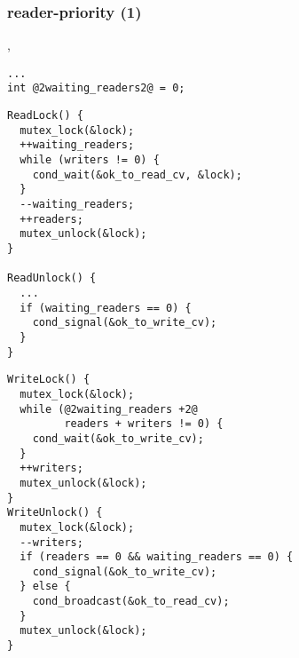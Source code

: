 

\begin{frame}[fragile,label=readerPriority]\frametitle{reader-priority (1)}
,
\begin{lstlisting}
...
int @2waiting_readers2@ = 0;
\end{lstlisting}
\begin{minipage}{0.45\textwidth}
\begin{lstlisting}
ReadLock() {
  mutex_lock(&lock);
  ++waiting_readers;
  while (writers != 0) {
    cond_wait(&ok_to_read_cv, &lock);
  }
  --waiting_readers;
  ++readers;
  mutex_unlock(&lock);
}

ReadUnlock() {
  ...
  if (waiting_readers == 0) {
    cond_signal(&ok_to_write_cv);
  }
}
\end{lstlisting}
\end{minipage}
\begin{minipage}{0.45\textwidth}
\begin{lstlisting}
WriteLock() {
  mutex_lock(&lock);
  while (@2waiting_readers +2@
         readers + writers != 0) {
    cond_wait(&ok_to_write_cv);
  }
  ++writers;
  mutex_unlock(&lock);
}
WriteUnlock() {
  mutex_lock(&lock);
  --writers;
  if (readers == 0 && waiting_readers == 0) {
    cond_signal(&ok_to_write_cv);
  } else {
    cond_broadcast(&ok_to_read_cv);
  }
  mutex_unlock(&lock);
}
\end{lstlisting}
\end{minipage}
\end{frame}

